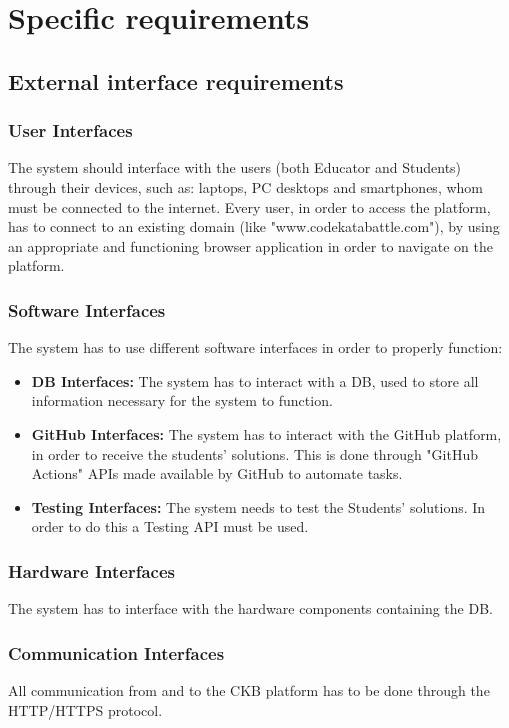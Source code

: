 \documentclass{article}
\begin{document}
{\newpage

\pagestyle{SpecificRequirementsStyle}

\section{Specific requirements}
\subsection{External interface requirements}
\subsubsection{User Interfaces}
The system should interface with the users (both Educator and Students) through their
devices, such as: laptops, PC desktops and smartphones, whom must be connected to the internet.
Every user, in order to access the platform, has to connect to an existing domain (like "www.codekatabattle.com"),
by using an appropriate and functioning browser application in order to navigate on the platform.

\subsubsection{Software Interfaces}
The system has to use different software interfaces in order to properly function:
\begin{itemize}
    \item \textbf{DB Interfaces:} The system has to interact with a DB,
          used to store all information necessary for the system to function.
    \item \textbf{GitHub Interfaces:} The system has to interact with the GitHub platform,
          in order to receive the students' solutions. This is done through "GitHub Actions"
          APIs made available by GitHub to automate tasks.
    \item \textbf{Testing Interfaces:} The system needs to test the Students' solutions.
          In order to do this a Testing API must be used.
\end{itemize}

\subsubsection{Hardware Interfaces}
The system has to interface with the hardware components containing
the DB.
\subsubsection{Communication Interfaces}
All communication from and to the CKB platform has to be done through the HTTP/HTTPS protocol.

}
\end{document}
